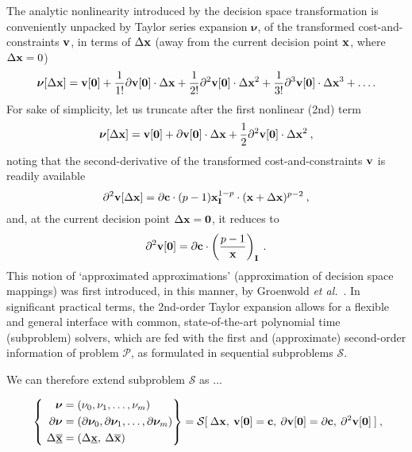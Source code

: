 \documentclass[11pt]{article}
\begin{document}
The analytic nonlinearity introduced by the decision space transformation is conveniently unpacked by Taylor series expansion $\bm{\nu}$, of the transformed cost-and-constraints $\mathbf{v}$, in terms of $\Delta \mathbf{x}$ (away from the current decision point $\mathbf{x}$, where $\Delta \mathbf{x}=0$)
\begin{equation}
\bm{\nu}[\Delta \mathbf{x}] = \mathbf{v}[\mathbf{0}] + \frac{1}{1!}\partial \mathbf{v}[\mathbf{0}] \cdot  \Delta \mathbf{x} + \frac{1}{2!}\partial^2 \mathbf{v} [\mathbf{0}] \cdot \Delta \mathbf{x}^2 + \frac{1}{3!}\partial^3 \mathbf{v}[\mathbf{0}] \cdot \Delta \mathbf{x}^3 + \ldots .
\end{equation}
For sake of simplicity, let us truncate after the first nonlinear (2nd) term
\begin{equation}
\bm{\nu}[\Delta \mathbf{x}] = \mathbf{v}[\mathbf{0}] + \partial \mathbf{v}[\mathbf{0}] \cdot \Delta \mathbf{x} + \frac{1}{2}\partial^2 \mathbf{v}[\mathbf{0}] \cdot  \Delta \mathbf{x}^2 \: , 
\end{equation}
noting that the second-derivative of the transformed cost-and-constraints $\mathbf{v}$ is readily available
\begin{equation}
\partial^2 \mathbf{v}[\Delta \mathbf{x}] = \partial \mathbf{c} \cdot (p-1)\mathbf{x}_{\mathbf{I}}^{1-p} \cdot (\mathbf{x}+\Delta\mathbf{x})^{p-2} \: ,
\end{equation}
and, at the current decision point $\Delta \mathbf{x} = \mathbf{0}$, it reduces to
\begin{equation}
\partial^2 \mathbf{v}[\mathbf{0}] = \partial \mathbf{c} \cdot \left(\frac{p-1}{\mathbf{x}}\right)_{\mathbf{I}} \: .
\end{equation}
This notion of `approximated approximations' (approximation of decision space mappings) was first introduced, in this manner, by Groenwold \emph{et al.}~\cite{groenwold2010approximated}. In significant practical terms, the 2nd-order Taylor expansion allows for a flexible and general interface with common, state-of-the-art polynomial time (subproblem) solvers, which are fed with the first and (approximate) second-order information of problem $\mathcal{P}$, as formulated in sequential subproblems $\mathcal{S}$. %

We can therefore extend subproblem $\mathcal{S}$ as ... 


\begin{align}
 ~\left\{ ~
\begin{aligned}
\bm{\nu} &= (\nu_0, \nu_1, \ldots, \nu_m )\\
\partial \bm{\nu} & = (\partial \bm{\nu}_0 , \partial \bm{\nu}_1 , \ldots,\partial \bm{\nu}_m  ) \\
\Delta \underline{\overline{\mathbf{x}}} & = ( \Delta \underline{\mathbf{x}} , \: \Delta \overline{\mathbf{x}} ) \:
\end{aligned}\right\} =
\mathcal{S} [ \: \Delta \mathbf{x}, \: \mathbf{v}[\mathbf{0}] = \mathbf{c}, \: \partial \mathbf{v}[\mathbf{0}] = \partial \mathbf{c}, \: \partial^2 \mathbf{v} [\mathbf{0}] \: ] \: ,
\end{align}
\end{document}
